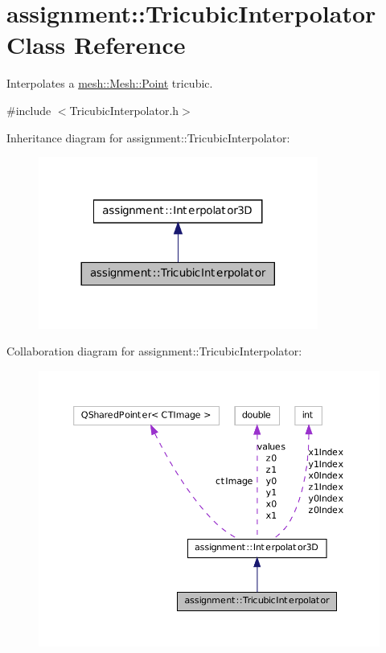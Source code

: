 \hypertarget{classassignment_1_1_tricubic_interpolator}{
\section{assignment::TricubicInterpolator Class Reference}
\label{classassignment_1_1_tricubic_interpolator}
}


Interpolates a \hyperlink{structmesh_1_1_mesh_1_1_point}{mesh::Mesh::Point} tricubic.  




{\ttfamily \#include $<$TricubicInterpolator.h$>$}



Inheritance diagram for assignment::TricubicInterpolator:\nopagebreak
\begin{figure}[H]
\begin{center}
\leavevmode
\includegraphics[width=260pt]{classassignment_1_1_tricubic_interpolator__inherit__graph}
\end{center}
\end{figure}


Collaboration diagram for assignment::TricubicInterpolator:\nopagebreak
\begin{figure}[H]
\begin{center}
\leavevmode
\includegraphics[width=385pt]{classassignment_1_1_tricubic_interpolator__coll__graph}
\end{center}
\end{figure}

